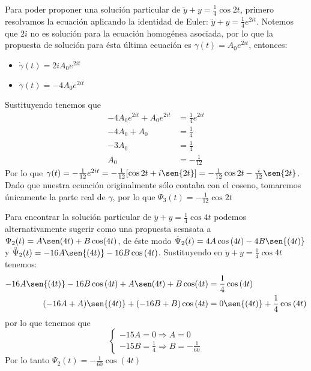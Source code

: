 \documentclass{article}
\begin{document}
\begin{enumerate}
{            Para poder proponer una solución particular de $\ddot y+y=\frac{1}{4}\cos{2t}$, primero
            resolvamos la ecuación aplicando la identidad de Euler: $\ddot y+y=\frac{1}{4}e^{2it}$.
            Notemos que $2i$ no es solución para la ecuación homogénea asociada, por lo que la
            propuesta de solución para ésta última ecuación es $\gamma(t)=A_0e^{2it}$, entonces:
            \begin{itemize}
                \item $\dot\gamma(t)=2iA_0e^{2it}$
                \item $\ddot\gamma(t)=-4A_0e^{2it}$
            \end{itemize}
            Sustituyendo tenemos que
            \begin{align*}
                -4A_0e^{2it}+A_0e^{2it} &= \frac{1}{4}e^{2it} \\[0.2cm]
                -4A_0+A_0 &= \frac{1}{4} \\[0.2cm]
                -3A_0 &= \frac{1}{4} \\[0.2cm]
                A_0 &= -\frac{1}{12}
            \end{align*}
            Por lo que $\gamma(t)=-\frac{1}{12}e^{2it}=-\frac{1}{12}[\cos{2t}+i\sen{2t}]
            =-\frac{1}{12}\cos{2t}-\frac{i}{12}\sen{2t}$. Dado que nuestra ecuación originalmente
            sólo contaba con el coseno, tomaremos únicamente la parte real de $\gamma$, por lo que
            $\Psi_3(t)=-\frac{1}{12}\cos{2t}$

            Para encontrar la solución particular de $\ddot y+y=\frac{1}{4}\cos{4t}$ podemos
            alternativamente sugerir como una propuesta sesnsata a $\Psi_2(t)=A\sen(4t)+B\cos(4t)$,
            de éste modo $\dot\Psi_2(t)=4A\cos{(4t)}-4B\sen{(4t)}$ y $\ddot\Psi_2(t)=-16A\sen{(4t)}
            -16B\cos{(4t)}$. Sustituyendo en $\ddot y+y=\frac{1}{4}\cos{4t}$ tenemos:
            \begin{align*}
                -16A\sen{(4t)}-16B\cos{(4t)}+A\sen(4t)+B\cos(4t) &= \frac{1}{4}\cos{(4t)} \\
                (-16A+A)\sen{(4t)}+(-16B+B)\cos{(4t)} &= 0\sen{(4t)}+\frac{1}{4}\cos{(4t)} \\
            \end{align*}
            por lo que tenemos que
            \begin{equation*}
                \begin{cases}
                    -15A=0 \Rightarrow A=0 \\
                    -15B=\frac{1}{4} \Rightarrow B=-\frac{1}{60}
                \end{cases}
            \end{equation*}
            Por lo tanto $\Psi_2(t)=-\frac{1}{60}\cos{(4t)}$

}
\end{enumerate}
\end{document}

